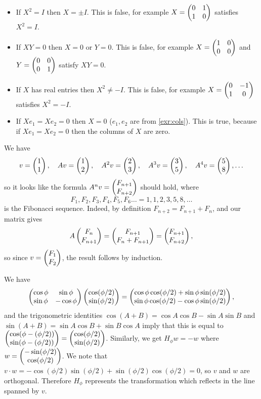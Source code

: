 \documentclass{article}
\begin{document}
\begin{Solution}\label{sol:exr:truefalse}
\begin{itemize}
\item If \(X^2=I\) then \(X=\pm I\). This is false, for example \(X=\begin{pmatrix}
0 & 1 \\ 1 & 0\end{pmatrix}\) satisfies \(X^2=I\).
\item If \(XY=0\) then \(X=0\) or \(Y=0\). This is false, for example
\(X=\begin{pmatrix} 1 & 0 \\ 0 & 0 \end{pmatrix}\) and \(Y=\begin{pmatrix} 0 & 0 \\ 0 & 1\end{pmatrix}\)
satisfy \(XY=0\).
\item If \(X\) has real entries then \(X^2\neq -I\). This is false, for
example \(X=\begin{pmatrix} 0 & -1 \\ 1 & 0 \end{pmatrix}\) satisfies \(X^2=-I\).
\item If \(Xe_1=Xe_2=0\) then \(X=0\) (\(e_1,e_2\) are from
\cref{exr:cols}). This is true, because if \(Xe_1=Xe_2=0\) then
the columns of \(X\) are zero.


\end{itemize}
\end{Solution}
\begin{Solution}\label{sol:exr:fib}
We have \[v=\begin{pmatrix} 1\\ 1\end{pmatrix},\quad Av=\begin{pmatrix} 1\\ 2\end{pmatrix},\quad A^2v=\begin{pmatrix}
2\\ 3\end{pmatrix},\quad A^3v=\begin{pmatrix} 3\\ 5\end{pmatrix},\quad A^4v=\begin{pmatrix} 5\\8\end{pmatrix},\ldots\] so
it looks like the formula \(A^nv=\begin{pmatrix} F_{n+1}\\ F_{n+2}\end{pmatrix}\) should hold,
where \[F_1,F_2,F_3,F_4,F_5,F_6\ldots=1,1,2,3,5,8,\ldots\] is the
Fibonacci sequence. Indeed, by definition \(F_{n+2}=F_{n+1}+F_n\),
and our matrix gives \[A\begin{pmatrix} F_n\\ F_{n+1}\end{pmatrix}=\begin{pmatrix}
F_{n+1}\\ F_n+F_{n+1}\end{pmatrix}=\begin{pmatrix} F_{n+1}\\ F_{n+2}\end{pmatrix},\] so since
\(v=\begin{pmatrix} F_1\\ F_2\end{pmatrix}\), the result follows by induction.


\end{Solution}
\begin{Solution}\label{sol:exr:ref}
We have \[\begin{pmatrix} \cos\phi & \sin\phi\\ \sin\phi &
-\cos\phi\end{pmatrix}\begin{pmatrix}\cos(\phi/2)\\ \sin(\phi/2)\end{pmatrix}=\begin{pmatrix}
\cos\phi\cos(\phi/2)+\sin\phi\sin(\phi/2)\\ \sin\phi\cos(\phi/2)-\cos\phi\sin(\phi/2)\end{pmatrix},\]
and the trigonometric identities \(\cos(A+B)=\cos A\cos B-\sin A\sin
B\) and \(\sin(A+B)=\sin A\cos B+\sin B\cos A\) imply that this is
equal to \(\begin{pmatrix} \cos(\phi-(\phi/2))\\\sin(\phi-(\phi/2))\end{pmatrix}=\begin{pmatrix}
\cos(\phi/2)\\ \sin(\phi/2)\end{pmatrix}\). Similarly, we get \(H_\phi w=-w\)
where \(w=\begin{pmatrix} -\sin(\phi/2)\\ \cos(\phi/2)\end{pmatrix}\). We note that
\(v\cdot w=-\cos(\phi/2)\sin(\phi/2)+\sin(\phi/2)\cos(\phi/2)=0\),
so \(v\) and \(w\) are orthogonal. Therefore \(H_\phi\) represents
the transformation which reflects in the line spanned by \(v\).


\end{Solution}
\end{document}
